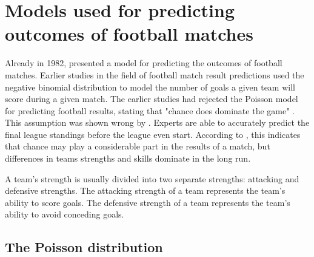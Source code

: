 \section{Models used for predicting outcomes of football matches}
\label{sec:background-models}

Already in 1982, \citeauthor{bib:maher-1982} presented a model for predicting the outcomes of football matches. Earlier studies in the field of football match result predictions used the negative binomial distribution to model the number of goals a given team will score during a given match. The earlier studies had rejected the Poisson model for predicting football results, stating that "chance does dominate the game" \citep{bib:maher-1982}. This assumption was shown wrong by \citet{bib:hill-1974}. Experts are able to accurately predict the final league standings before the league even start. According to \citet{bib:maher-1982}, this indicates that chance may play a considerable part in the results of a match, but differences in teams strengths and skills dominate in the long run.

A team's strength is usually divided into two separate strengths: attacking and defensive strengths. The attacking strength of a team represents the team's ability to score goals. The defensive strength of a team represents the team's ability to avoid conceding goals.

\subsection{The Poisson distribution}

